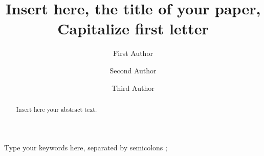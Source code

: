 \documentclass[3p,times,procedia]{elsarticle}
\begin{document}
\begin{frontmatter}




\title{Insert here, the title of your paper, Capitalize first letter}




\author[a]{First Author} 
\author[b]{Second Author}
\author[a,b]{Third Author}

\address[a]{First affiliation, Address, City and Postcode, Country}
\address[b]{Second affiliation, Address, City and Postcode, Country}

\begin{abstract}
Insert here your abstract text.
\end{abstract}

\begin{keyword}
Type your keywords here, separated by semicolons ; 




\end{keyword}
\end{frontmatter}
\end{document}
